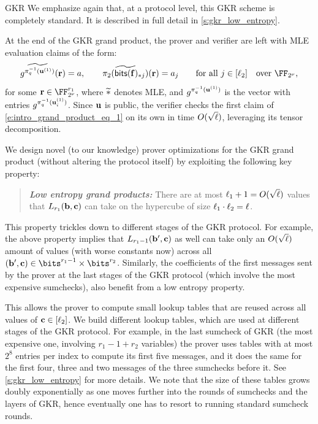 \begin{lncsmove}{GKR}
    We emphasize again that, at a protocol level, this GKR scheme is completely standard. It is described in full detail in  \cref{s:gkr_low_entropy}. 
    
    
    At the end of the GKR grand product, the prover and verifier are left with MLE evaluation claims of the form:
    \begin{equation}\label{e:intro_grand_product_eq_1}
    \mle{g^{\pi_q^{-1}(\uu^{(1)})}}(\rr) = a,\qquad \mle{\pi_2(\bitstext(\bff)_{*j})}(\rr)=a_j \qquad \text{for all } j \in [\codedim_2] \quad \text{over } \comfield,
    \end{equation}
    for some $\rr\in \comfield^{r_1}$, where ${\widetilde{*}}$ denotes MLE, and $g^{\pi_q^{-1}(\mathbf{u}^{(1)})}$ is the vector with entries $g^{\pi_q^{-1}(\mathbf{u}^{(1)}_i)}$.   Since $\mathbf{u}$ is public, the verifier checks the first claim of \eqref{e:intro_grand_product_eq_1} on its own in time $O(\sqrt{\ell})$, leveraging its tensor decomposition. \iflncs\else \fi


    
        
    We design novel (to our knowledge) prover optimizations for the GKR grand product (without altering the protocol itself) by exploiting the following key property:
    \medskip

    \begin{quote}\emph{\textbf{Low entropy grand products:}} There are at most $\ell_1+1=O(\sqrt{\ell})$ values that $L_{r_1}(\mathbf{b},\mathbf{c})$ can take on the hypercube of size $\ell_1\cdot \ell_2 = \ell$. \end{quote}

     

    This property trickles down to different stages of the GKR protocol. For example, the above property implies that $L_{r_1-1}(\mathbf{b}',\mathbf{c})$ as well can take only an $O(\sqrt{\ell})$ amount of values (with worse constants now) across all $(\bb',\cc)\in \bits^{r_1-1}\times \bits^{r_2}$. Similarly, the coefficients of the first messages sent by the prover at the last stages of the GKR protocol (which involve the most expensive sumchecks), also benefit from a low entropy property. 


            This allows the prover to compute small lookup tables that are reused across all values of $\mathbf{c}\in [\ell_2]$. We build different lookup tables, which are used at different stages of the GKR protocol.  For example, in the last sumcheck of GKR (the most expensive one, involving $r_1-1+r_2$ variables) the prover uses tables with at most $2^8$ entries per index to compute its first five messages, and it does the same for the first four, three and two messages of the three sumchecks before it.  See \cref{s:gkr_low_entropy} for more details. We note that the size of these tables grows doubly exponentially as one moves further into the rounds of sumchecks and the layers of GKR, hence eventually one has to resort to running standard sumcheck rounds.


\end{lncsmove}

